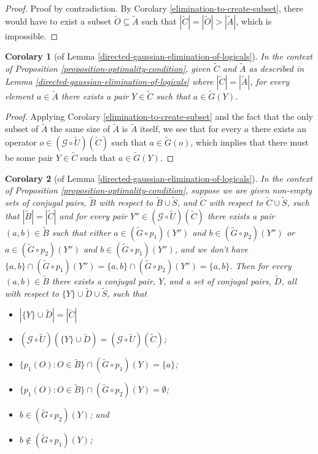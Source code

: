 \documentclass[twocolumn,showpacs,preprintnumbers,amsmath,amssymb,nofootinbib,pra,floatfix]{revtex4-1}
\newtheorem{corolary}{Corolary}
\newcommand{\set}{\tilde}
\newcommand{\genfun}{\mathcal{G}}
\begin{document}
\begin{proof}
Proof by contradiction.  By Corolary \ref{elimination-to-create-subset}, there would have to exist a subset $\set O\subseteq\set A$ such that $|\set C|=|\set O|>|\set A|$, which is impossible.
\end{proof}
\begin{corolary}[of Lemma \ref{directed-gaussian-elimination-of-logicals}]
\label{all-are-present}
In the context of Proposition \ref{proposition-optimality-condition}, given $\set C$ and $\set A$ as described in Lemma \ref{directed-gaussian-elimination-of-logicals} where $|\set C|=|\set A|$, for every element $a\in\set A$ there exists a pair $Y\in\set C$ such that $a\in\set G(Y)$.
\end{corolary}

\begin{proof}
Applying Corolary \ref{elimination-to-create-subset} and the fact that the only subset of $\set A$ the same size of $\set A$ is $\set A$ itself, we see that for every $a$ there exists an operator $o\in(\genfun\circ\set U)(\set C)$ such that $a\in\set G(o)$, which implies that there must be some pair $Y\in\set C$ such that $a\in\set G(Y)$.
\end{proof}
\begin{corolary}[of Lemma \ref{directed-gaussian-elimination-of-logicals}]
\label{elimination-to-isolate}
In the context of Proposition \ref{proposition-optimality-condition}, suppose we are given non-empty sets of conjugal pairs, $\set B$ with respect to $\set B\cup\set S$, and $\set C$ with respect to $\set C\cup\set S$, such that $|\set B|=|\set C|$ and for every pair $Y''\in(\genfun\circ\set U)(\set C)$ there exists a pair $(a,b)\in\set B$ such that either $a\in (\set G\circ p_1)(Y'')$ and $b\in (\set G\circ p_2)(Y'')$ or $a\in (\set G\circ p_2)(Y'')$ and $b\in (\set G\circ p_1)(Y'')$, and we don't have $\{a,b\}\cap(\set G\circ p_1)(Y'')=\{a,b\}\cap(\set G\circ p_2)(Y'')=\{a,b\}$.  Then for every $(a,b)\in\set B$ there exists a conjugal pair, $Y$, and a set of conjugal pairs, $\set D$, all with respect to $\{Y\}\cup\set D\cup\set S$, such that
\begin{itemize}
\item $|\{Y\}\cup \set D| = |\set C|$
\item $(\genfun\circ\set U)(\{Y\}\cup \set D)=(\genfun\circ\set U)(\set C)$;
\item $\{p_1(O):O\in\set B\}\cap (\set G\circ p_1)(Y)=\{a\}$;
\item $\{p_1(O):O\in\set B\}\cap (\set G\circ p_2)(Y)=\emptyset$;
\item $b\in (\set G\circ p_2)(Y)$; and
\item $b\notin (\set G\circ p_1)(Y)$;
\end{itemize}
\end{corolary}
\end{document}
